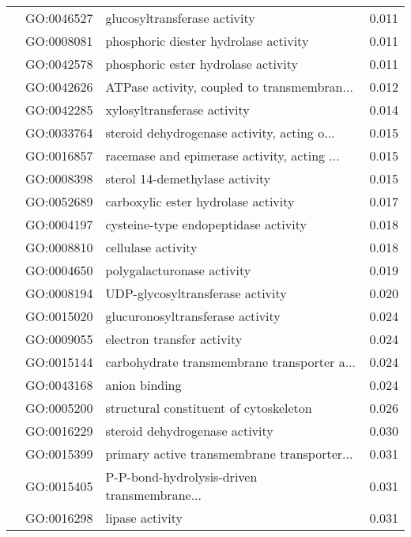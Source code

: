 \begin{longtable}{lllr}
   & GO:0046527 &                 glucosyltransferase activity &         0.011 \\
   & GO:0008081 &        phosphoric diester hydrolase activity &         0.011 \\
   & GO:0042578 &          phosphoric ester hydrolase activity &         0.011 \\
   & GO:0042626 &  ATPase activity, coupled to transmembran... &         0.012 \\
   & GO:0042285 &                  xylosyltransferase activity &         0.014 \\
   & GO:0033764 &  steroid dehydrogenase activity, acting o... &         0.015 \\
   & GO:0016857 &  racemase and epimerase activity, acting ... &         0.015 \\
   & GO:0008398 &               sterol 14-demethylase activity &         0.015 \\
   & GO:0052689 &          carboxylic ester hydrolase activity &         0.017 \\
   & GO:0004197 &         cysteine-type endopeptidase activity &         0.018 \\
   & GO:0008810 &                           cellulase activity &         0.018 \\
   & GO:0004650 &                   polygalacturonase activity &         0.019 \\
   & GO:0008194 &             UDP-glycosyltransferase activity &         0.020 \\
   & GO:0015020 &             glucuronosyltransferase activity &         0.024 \\
   & GO:0009055 &                   electron transfer activity &         0.024 \\
   & GO:0015144 &  carbohydrate transmembrane transporter a... &         0.024 \\
   & GO:0043168 &                                anion binding &         0.024 \\
   & GO:0005200 &       structural constituent of cytoskeleton &         0.026 \\
   & GO:0016229 &               steroid dehydrogenase activity &         0.030 \\
   & GO:0015399 &  primary active transmembrane transporter... &         0.031 \\
   & GO:0015405 &  P-P-bond-hydrolysis-driven transmembrane... &         0.031 \\
   & GO:0016298 &                              lipase activity &         0.031 \\

\end{longtable}

